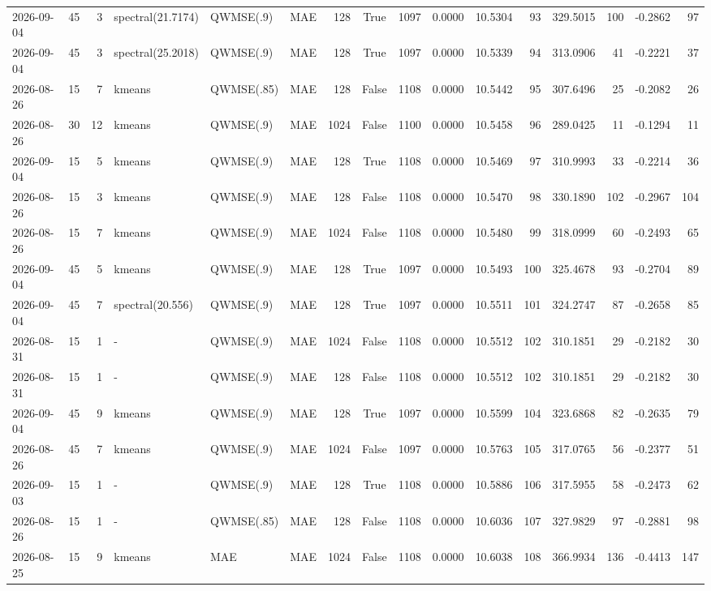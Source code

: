 \documentclass[10pt]{article}
\begin{document}
\begin{landscape}
\begin{longtable}{@{}lrrlllrcrrrrrrrr@{}}
2026-09-04 & 45 & 3 & spectral(21.7174) & QWMSE(.9) & MAE & 128 & True & 1097 & 0.0000 & 10.5304 & 93 & 329.5015 & 100 & -0.2862 & 97 \\
2026-09-04 & 45 & 3 & spectral(25.2018) & QWMSE(.9) & MAE & 128 & True & 1097 & 0.0000 & 10.5339 & 94 & 313.0906 & 41 & -0.2221 & 37 \\
2026-08-26 & 15 & 7 & kmeans & QWMSE(.85) & MAE & 128 & False & 1108 & 0.0000 & 10.5442 & 95 & 307.6496 & 25 & -0.2082 & 26 \\
2026-08-26 & 30 & 12 & kmeans & QWMSE(.9) & MAE & 1024 & False & 1100 & 0.0000 & 10.5458 & 96 & 289.0425 & 11 & -0.1294 & 11 \\
2026-09-04 & 15 & 5 & kmeans & QWMSE(.9) & MAE & 128 & True & 1108 & 0.0000 & 10.5469 & 97 & 310.9993 & 33 & -0.2214 & 36 \\
2026-08-26 & 15 & 3 & kmeans & QWMSE(.9) & MAE & 128 & False & 1108 & 0.0000 & 10.5470 & 98 & 330.1890 & 102 & -0.2967 & 104 \\
2026-08-26 & 15 & 7 & kmeans & QWMSE(.9) & MAE & 1024 & False & 1108 & 0.0000 & 10.5480 & 99 & 318.0999 & 60 & -0.2493 & 65 \\
2026-09-04 & 45 & 5 & kmeans & QWMSE(.9) & MAE & 128 & True & 1097 & 0.0000 & 10.5493 & 100 & 325.4678 & 93 & -0.2704 & 89 \\
2026-09-04 & 45 & 7 & spectral(20.556) & QWMSE(.9) & MAE & 128 & True & 1097 & 0.0000 & 10.5511 & 101 & 324.2747 & 87 & -0.2658 & 85 \\
2026-08-31 & 15 & 1 & - & QWMSE(.9) & MAE & 1024 & False & 1108 & 0.0000 & 10.5512 & 102 & 310.1851 & 29 & -0.2182 & 30 \\
2026-08-31 & 15 & 1 & - & QWMSE(.9) & MAE & 128 & False & 1108 & 0.0000 & 10.5512 & 102 & 310.1851 & 29 & -0.2182 & 30 \\
2026-09-04 & 45 & 9 & kmeans & QWMSE(.9) & MAE & 128 & True & 1097 & 0.0000 & 10.5599 & 104 & 323.6868 & 82 & -0.2635 & 79 \\
2026-08-26 & 45 & 7 & kmeans & QWMSE(.9) & MAE & 1024 & False & 1097 & 0.0000 & 10.5763 & 105 & 317.0765 & 56 & -0.2377 & 51 \\
2026-09-03 & 15 & 1 & - & QWMSE(.9) & MAE & 128 & True & 1108 & 0.0000 & 10.5886 & 106 & 317.5955 & 58 & -0.2473 & 62 \\
2026-08-26 & 15 & 1 & - & QWMSE(.85) & MAE & 128 & False & 1108 & 0.0000 & 10.6036 & 107 & 327.9829 & 97 & -0.2881 & 98 \\
2026-08-25 & 15 & 9 & kmeans & MAE & MAE & 1024 & False & 1108 & 0.0000 & 10.6038 & 108 & 366.9934 & 136 & -0.4413 & 147 \\

\end{longtable}
\end{landscape}
\end{document}

